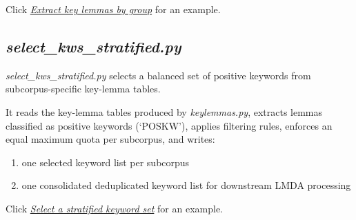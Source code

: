 Click \href{https://github.com/laelgelc/cl_st1_anna/blob/main/cl_st1_ph2_anna/cl_st1_ph2_anna_pipeline.md#3-extract-key-lemmas-by-group}{\textit{Extract key lemmas by group}} for an example.

\subsection{\textit{select\_kws\_stratified.py}}

\textit{select\_kws\_stratified.py} selects a balanced set of positive keywords from subcorpus-specific key-lemma tables.

It reads the key-lemma tables produced by \textit{keylemmas.py}, extracts lemmas classified as positive keywords (`POSKW'), applies filtering rules, enforces an equal maximum quota per subcorpus, and writes:

\begin{enumerate}
    \item one selected keyword list per subcorpus
    \item one consolidated deduplicated keyword list for downstream LMDA processing
\end{enumerate}

Click \href{https://github.com/laelgelc/cl_st1_anna/blob/main/cl_st1_ph2_anna/cl_st1_ph2_anna_pipeline.md#4-select-a-stratified-keyword-set}{\textit{Select a stratified keyword set}} for an example.
